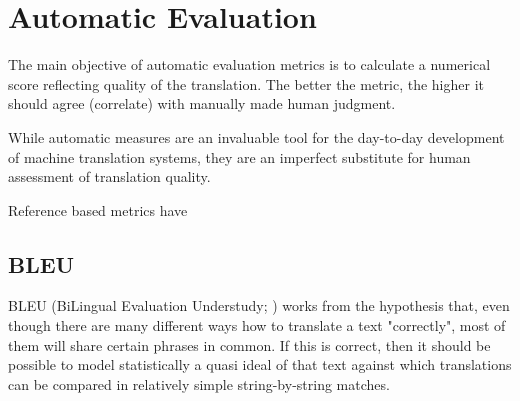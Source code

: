  

\section{Automatic Evaluation}
The main objective of automatic evaluation metrics is to calculate a numerical 
score reflecting quality of the translation. The better the metric, the higher it
should agree (correlate) with manually made human judgment. 

While automatic measures are an invaluable tool for the day-to-day development of machine translation systems, they are an imperfect substitute for human assessment of translation quality. 

Reference based metrics have 


\subsection{BLEU}
BLEU (BiLingual Evaluation Understudy; \cite{bleu}) works from the hypothesis that, even though there are many different
ways how to translate a text "correctly", most of them will share certain phrases in common. If this is correct, then it should
be possible to model statistically a quasi ideal of that text against which translations can be compared in relatively simple 
string-by-string matches. 


